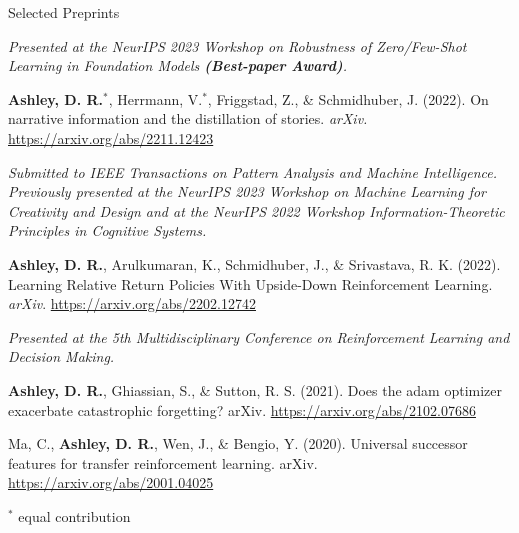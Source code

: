 \documentclass{cv}
\begin{document}
\begin{rSection}{Selected Preprints}
\begin{rPublications}
        \vspace{-0.25em} \textit{Presented at the NeurIPS 2023 Workshop on Robustness of Zero/Few-Shot Learning in Foundation Models \textbf{(Best-paper Award)}.}
    \item
        \textbf{Ashley, D. R.}$^*$, Herrmann, V.$^*$, Friggstad, Z., \& Schmidhuber, J.
        (2022).
        On narrative information and the distillation of stories.
        \textit{arXiv.}
        \url{https://arxiv.org/abs/2211.12423}

        \vspace{-0.5em} \textit{Submitted to {IEEE} Transactions on Pattern Analysis and Machine Intelligence. Previously presented at the NeurIPS 2023 Workshop on Machine Learning for Creativity and Design and at the NeurIPS 2022 Workshop Information-Theoretic Principles in Cognitive Systems.}
    \item
        \textbf{Ashley, D. R.}, Arulkumaran, K., Schmidhuber, J., \& Srivastava, R. K.
        (2022).
        Learning Relative Return Policies With Upside-Down Reinforcement Learning.
        \textit{arXiv}.
        \url{https://arxiv.org/abs/2202.12742}

        \vspace{-0.5em} \textit{Presented at the 5th Multidisciplinary Conference on Reinforcement Learning and Decision Making.}
    \item
        \textbf{Ashley, D. R.}, Ghiassian, S., \& Sutton, R. S.
        (2021).
        Does the adam optimizer exacerbate catastrophic forgetting?
        arXiv.
        \url{https://arxiv.org/abs/2102.07686}
    \item
        Ma, C., \textbf{Ashley, D. R.}, Wen, J., \& Bengio, Y.
        (2020).
        Universal successor features for transfer reinforcement learning.
        arXiv.
        \url{https://arxiv.org/abs/2001.04025}
\end{rPublications}

\vspace{-0.3em} \hfill $^*$ \footnotesize{equal contribution} \vspace{-0.7em}

\end{rSection}

\clearpage

\end{document}
